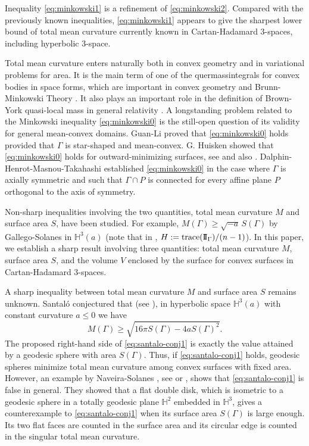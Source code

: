 \documentclass[11pt]{amsart}
\theoremstyle{definition}
\newcommand{\HH}{\mathbb{H}}
\theoremstyle{remark}
\numberwithin{equation}{section}
\begin{document}
	Inequality \eqref{eq:minkowski1} is a refinement of \eqref{eq:minkowski2}. Compared with the previously known inequalities, \eqref{eq:minkowski1} appears to give the sharpest lower bound of total mean curvature currently known in Cartan-Hadamard 3-spaces, including hyperbolic 3-space.

	Total mean curvature enters naturally both in convex geometry and in variational problems for area. It is the main term of one of the quermassintegrals for convex bodies in space forms, which are important in convex geometry and Brunn-Minkowski Theory \cite{schneider2014}. It also plays an important role in the definition of Brown-York quasi-local mass in general relativity \cite{brown-york1993}. A longstanding problem related to the Minkowski inequality \eqref{eq:minkowski0} is the still-open question of its validity for general mean-convex domains. 
	Guan-Li \cite[Theorem 2]{guan-li2009} proved that \eqref{eq:minkowski0} holds provided that $\Gamma$ is star-shaped and mean-convex. G. Huisken showed that \eqref{eq:minkowski0} holds for outward-minimizing surfaces, see \cite[Theorem 6]{guan-li2009} and also \cite{huisken2009}. Dalphin-Henrot-Masnou-Takahashi \cite[Theorem 1.1]{dalphin2016} established \eqref{eq:minkowski0} in the case where $\Gamma$ is axially symmetric and such that $\Gamma \cap P$ is connected for every affine plane $P$ orthogonal to the axis of symmetry.
	
	Non-sharp inequalities involving the two quantities, total mean curvature $M$ and surface area $S$, have been studied. For example, $ M(\Gamma)\geq \sqrt{-a}\,S(\Gamma)$ by Gallego-Solanes \cites{gallego-solanes} in $\HH^3(a)$ (note that in \cite{gallego-solanes}, $H:=\textup{trace}(\mathrm{I\!I}_\Gamma)/(n-1)$). 
	In this paper, we establish a sharp result involving three quantities: total mean curvature $M$, surface area $S$, and the volume $V$ enclosed by the surface for convex surfaces in Cartan-Hadamard 3-spaces. 
	
	A sharp inequality between total mean curvature $M$ and surface area $S$ remains unknown. Santal\'{o} conjectured \cite{santalo1963} that (see  \cite[p. 78]{santalo2009}), in hyperbolic space $\HH^3(a)$ with constant curvature $a \leq 0$ we have
	\begin{equation}\label{eq:santalo-conj1}
	M(\Gamma) \geq \sqrt{16\pi S(\Gamma)-4a S(\Gamma)^2}.  
	\end{equation}
	The proposed right-hand side of \eqref{eq:santalo-conj1} is exactly the value attained by a geodesic sphere with area \(S(\Gamma)\). Thus, if \eqref{eq:santalo-conj1} holds, geodesic spheres minimize total mean curvature among convex surfaces with fixed area. However, an example by Naveira-Solanes  \cite[p. 815]{santalo2009}, see  \cite[p. 109]{natario2015} or \cite[Note 1.3]{ghomi-spruck2023}, shows that \eqref{eq:santalo-conj1} is false in general. They showed that a flat double disk, which is isometric to a geodesic sphere in a totally geodesic plane $\HH^2$ embedded in $\HH^3$, gives a counterexample to \eqref{eq:santalo-conj1} when its surface area $S(\Gamma)$ is large enough. Its two flat faces are counted in the surface area and its circular edge is counted in the singular total mean curvature.
	
\end{document}
